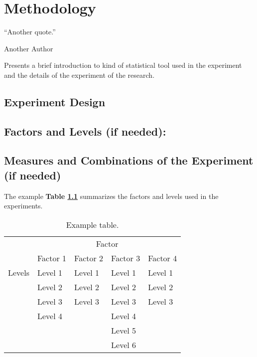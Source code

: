 


\chapter{Methodology}
\label{chapter:methodology}
\epigraph{``Another quote.''}{\vspace{10pt}Another Author }

\newpage

Presents a brief introduction to kind of statistical tool used in the experiment and the details of the experiment of the research. 
\section{Experiment Design}
\label{section:experiment-design}

\section{Factors and Levels (if needed):}

\section{Measures and Combinations of the Experiment (if needed)}
The example \textbf{Table \ref{tab:table}} summarizes the factors and levels used in the experiments.
\begin{table}[h]
	\caption{Example table.}
	\label{tab:table}
	\begin{center}
		\begin{tabular}{|l|l|l|l|l|}
			\cline{2-5}
			\multicolumn{1}{c|}{}	& \multicolumn{4}{c|}{Factor} \\ 
			\cline{2-5}
			\multicolumn{1}{c|}{}	& Factor 1 & Factor 2 & Factor 3 & Factor 4 \\ \hline
			Levels
			& Level 1 & Level 1	& Level 1  & Level 1   \\
			& Level 2 & Level 2  & Level 2 & Level 2 \\
			& Level 3 & Level 3 & Level 3 & Level 3 \\
			& Level 4 &    & Level 4  &   \\ 
			&  &    & Level 5  &   \\ 
			&  &    & Level 6  &     \\\hline
		\end{tabular}
	\end{center}
\end{table}



